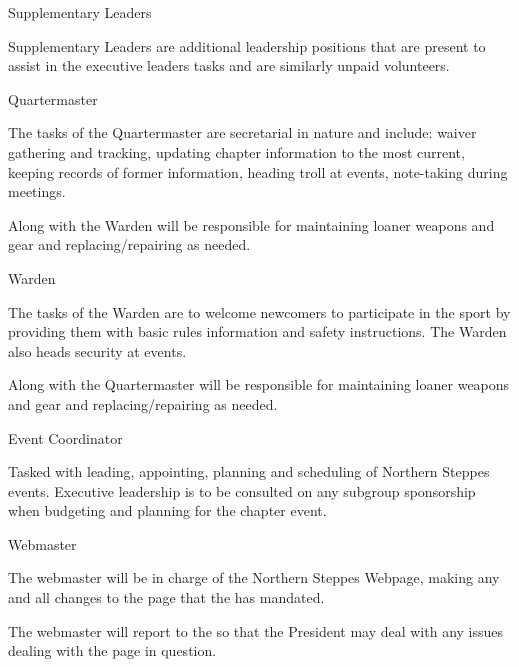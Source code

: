 \documentclass[12pt]{article}
\begin{document}
\begin{level}
    \item Supplementary Leaders
    \begin{level} 
        \item Supplementary Leaders are additional leadership positions that are present to assist in the
    executive leaders tasks and are similarly unpaid volunteers.
        \item Quartermaster
        \begin{level} 
            \item The tasks of the Quartermaster are secretarial in nature and include: waiver gathering and tracking, updating chapter information to the most current, keeping records of former information, heading troll at events, note-taking during meetings.
            \item Along with the Warden will be responsible for maintaining loaner weapons and gear and replacing/repairing as needed.
        \end{level}
        \item Warden
        \begin{level} 
            \item The tasks of the Warden are to welcome newcomers to participate in the sport by providing them with basic rules information and safety instructions. The Warden also heads security at events.
            \item Along with the Quartermaster will be responsible for maintaining loaner weapons and gear and replacing/repairing as needed.
        \end{level}
        \item Event Coordinator
        \begin{level} 
            \item Tasked with leading, appointing, planning and scheduling of Northern Steppes events. Executive leadership is to be consulted on any subgroup sponsorship when budgeting and planning for the chapter event.
        \end{level}
        \item Webmaster
        \begin{level} 
            \item The webmaster will be in charge of the Northern Steppes Webpage, making any and all changes to the page that the  has mandated.
            \item The webmaster will report to the  so that the President may deal with any issues dealing with the page in question.

\end{level}
\end{level}
\end{level}
\end{document}
